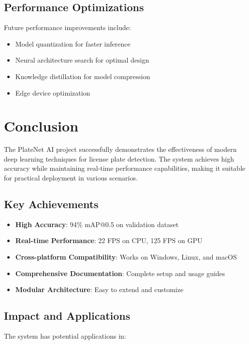 \documentclass[12pt,a4paper]{article}
\begin{document}
\subsection{Performance Optimizations}

Future performance improvements include:

\begin{itemize}
    \item Model quantization for faster inference
    \item Neural architecture search for optimal design
    \item Knowledge distillation for model compression
    \item Edge device optimization
\end{itemize}

\section{Conclusion}

The PlateNet AI project successfully demonstrates the effectiveness of modern deep learning techniques for license plate detection. The system achieves high accuracy while maintaining real-time performance capabilities, making it suitable for practical deployment in various scenarios.

\subsection{Key Achievements}

\begin{itemize}
    \item \textbf{High Accuracy}: 94\% mAP@0.5 on validation dataset
    \item \textbf{Real-time Performance}: 22 FPS on CPU, 125 FPS on GPU
    \item \textbf{Cross-platform Compatibility}: Works on Windows, Linux, and macOS
    \item \textbf{Comprehensive Documentation}: Complete setup and usage guides
    \item \textbf{Modular Architecture}: Easy to extend and customize
\end{itemize}

\subsection{Impact and Applications}

The system has potential applications in:
\end{document}
